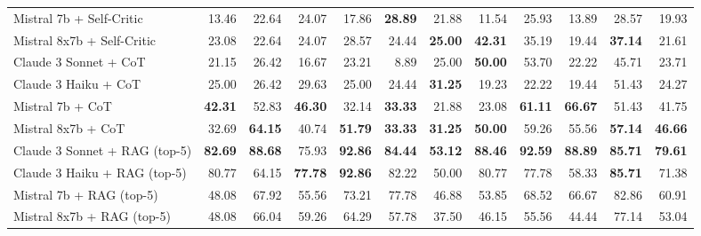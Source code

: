 \begin{table}[H]
{\begin{tabular}{lrrrrrrrrrrr}
\rowcolor{Gray}
Mistral 7b + Self-Critic & 13.46 & 22.64 & 24.07 & 17.86 & \textbf{28.89} & 21.88 & 11.54 & 25.93 & 13.89 & 28.57 & 19.93 \\
\rowcolor{Gray}
Mistral 8x7b + Self-Critic & 23.08 & 22.64 & 24.07 & 28.57 & 24.44 & \textbf{25.00} & \textbf{42.31} & 35.19 & 19.44 & \textbf{37.14} & 21.61 \\
Claude 3 Sonnet + CoT & 21.15 & 26.42 & 16.67 & 23.21 & 8.89 & 25.00 & \textbf{50.00} & 53.70 & 22.22 & 45.71 & 23.71 \\
Claude 3 Haiku + CoT & 25.00 & 26.42 & 29.63 & 25.00 & 24.44 & \textbf{31.25} & 19.23 & 22.22 & 19.44 & 51.43 & 24.27 \\
Mistral 7b + CoT & \textbf{42.31} & 52.83 & \textbf{46.30} & 32.14 & \textbf{33.33} & 21.88 & 23.08 & \textbf{61.11} & \textbf{66.67} & 51.43 & 41.75 \\
Mistral 8x7b + CoT & 32.69 & \textbf{64.15} & 40.74 & \textbf{51.79} & \textbf{33.33} & \textbf{31.25} & \textbf{50.00} & 59.26 & 55.56 & \textbf{57.14} & \textbf{46.66} \\
\rowcolor{Gray}
Claude 3 Sonnet + RAG (top-5) & \textbf{82.69} & \textbf{88.68} & 75.93 & \textbf{92.86} & \textbf{84.44} & \textbf{53.12} & \textbf{88.46} & \textbf{92.59} & \textbf{88.89} & \textbf{85.71} & \textbf{79.61} \\
\rowcolor{Gray}
Claude 3 Haiku + RAG (top-5) & 80.77 & 64.15 & \textbf{77.78} & \textbf{92.86} & 82.22 & 50.00 & 80.77 & 77.78 & 58.33 & \textbf{85.71} & 71.38 \\
\rowcolor{Gray}
Mistral 7b + RAG (top-5) & 48.08 & 67.92 & 55.56 & 73.21 & 77.78 & 46.88 & 53.85 & 68.52 & 66.67 & 82.86 & 60.91 \\
\rowcolor{Gray}
Mistral 8x7b + RAG (top-5) & 48.08 & 66.04 & 59.26 & 64.29 & 57.78 & 37.50 & 46.15 & 55.56 & 44.44 & 77.14 & 53.04 \\
\bottomrule
\end{tabular}
}
 \label{tab:implicit_20topics_70}
\end{table}




